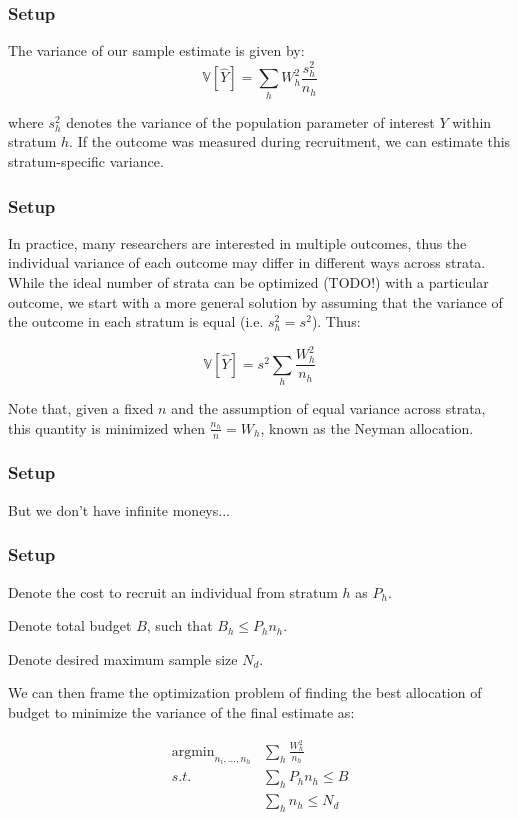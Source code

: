 \documentclass[aspectratio=169]{beamer}
\DeclareMathOperator*{\argmin}{argmin}
\begin{document}
\begin{frame}
\frametitle{Setup}

The variance of our sample estimate is given by:
$$
\mathbb{V}[\hat{Y}] =  \sum_{h}  W_h^2 \frac{s_h^2}{n_h}
$$

where $s_h^2$ denotes the variance of the population parameter of interest $Y$ within stratum $h$. If the outcome was measured during recruitment, we can estimate this stratum-specific variance.

\end{frame}
\begin{frame}
\frametitle{Setup}

In practice, many researchers are interested in multiple outcomes, thus the individual variance of each outcome may differ in different ways across strata. While the ideal number of strata can be optimized (TODO!) with a particular outcome, we start with a more general solution by assuming that the variance of the outcome in each stratum is equal (i.e. $s_h^2 = s^2$). Thus:

$$
\mathbb{V}[\hat{Y}] =  s^2  \sum_{h}  \frac{W_h^2}{n_h}
$$

Note that, given a fixed $n$ and the assumption of equal variance across strata, this quantity is minimized when $\frac{n_h}{n} = W_h$, known as the Neyman allocation.

\end{frame}


\begin{frame}
\frametitle{Setup}

But we don't have infinite moneys...

\end{frame}


\begin{frame}
\frametitle{Setup}

Denote the cost to recruit an individual from stratum $h$ as $P_h$.

Denote total budget $B$, such that $B_h \leq P_hn_h$.

Denote desired maximum sample size $N_d$.

We can then frame the optimization problem of finding the best allocation of budget to minimize the variance of the final estimate as:


\begin{align*}
\argmin_{n_i,...,n_h}  &\sum_{h}  \frac{W_h^2}{n_h} \\
s.t. &\sum_h P_hn_h \leq B \\
     &\sum_h n_h \leq N_d
\end{align*}

\end{frame}
\end{document}
